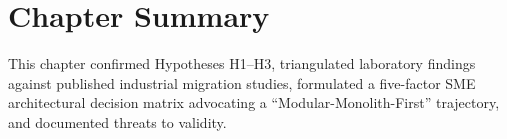 \section{Chapter Summary}
\label{sec:ch5-summary}
This chapter confirmed Hypotheses H1--H3, triangulated laboratory findings against published industrial migration studies, formulated a five-factor SME architectural decision matrix advocating a ``Modular-Monolith-First'' trajectory, and documented threats to validity.
